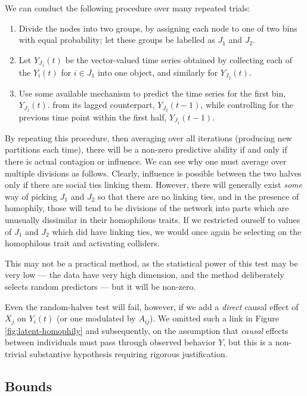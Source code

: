 \documentclass{article}
\begin{document}
\begin{multicols}{2}
We can conduct the following procedure over many repeated trials:
\begin{enumerate}
\item Divide the nodes into two groups, by assigning each node to one of two
  bins with equal probability; let these groups be labelled as $J_1$ and $J_2$.
\item Let $Y_{J_1}(t)$ be the vector-valued time series obtained by collecting
  each of the $Y_{i}(t)$ for $i \in J_1$ into one object, and similarly for $Y_{J_2}(t)$.
\item Use some available mechanism to predict the time series for the first
  bin, $Y_{J_1}(t)$. from its lagged counterpart, $Y_{J_2}(t-1)$, while
  controlling for the previous time point within the first half,
  $Y_{J_1}(t-1)$.
\end{enumerate} 

By repeating this procedure, then averaging over all iterations (producing new
partitions each time), there will be a non-zero predictive ability if and only
if there is actual contagion or influence. We can see why one must average over
multiple divisions as follows.  Clearly, influence is possible between the two
halves only if there are social ties linking them.  However, there will
generally exist {\em some} way of picking $J_1$ and $J_2$ so that there are no
linking ties, and in the presence of homophily, those will tend to be divisions
of the network into parts which are unusually dissimilar in their homophilous
traits.  If we restricted ourself to values of $J_1$ and $J_2$ which did have
linking ties, we would once again be selecting on the homophilous trait and
activating colliders.

This may not be a practical method, as the statistical power of this test may
be very low --- the data have very high dimension, and the method deliberately
selects random predictors --- but it will be non-zero.

Even the random-halves test will fail, however, if we add a {\em direct} causal
effect of $X_j$ on $Y_{i}(t)$ (or one modulated by $A_{ij}$).  We omitted such
a link in Figure \ref{fig:latent-homophily} and subsequently, on the assumption
that {\em causal} effects between individuals must pass through observed
behavior $Y$, but this is a non-trivial substantive hypothesis requiring
rigorous justification.


\subsection{Bounds}
\label{sec:bounds}


\end{multicols}
\end{document}
